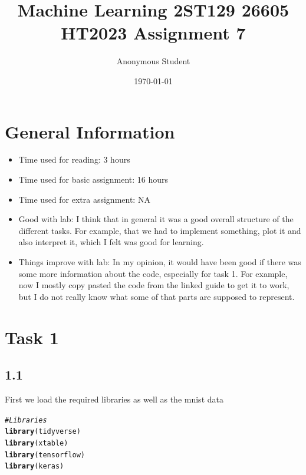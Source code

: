 \documentclass[10pt, a4paper, english]{article}\usepackage[]{graphicx}\usepackage[dvipsnames]{xcolor}
\title{Machine Learning 2ST129 26605 HT2023
 Assignment 7}
\author{Anonymous Student}
\date{\today}
\makeatletter
\newcommand{\hlcom}[1]{\textcolor[rgb]{0.678,0.584,0.686}{\textit{#1}}}%
\newcommand{\hlstd}[1]{\textcolor[rgb]{0.345,0.345,0.345}{#1}}%
\newcommand{\hlkwd}[1]{\textcolor[rgb]{0.737,0.353,0.396}{\textbf{#1}}}%
\newenvironment{kframe}{%
 \def\at@end@of@kframe{}%
 \ifinner\ifhmode%
  \def\at@end@of@kframe{\end{minipage}}%
  \begin{minipage}{\columnwidth}%
 \fi\fi%
 \def\FrameCommand##1{\hskip\@totalleftmargin \hskip-\fboxsep
 \colorbox{shadecolor}{##1}\hskip-\fboxsep
     \hskip-\linewidth \hskip-\@totalleftmargin \hskip\columnwidth}%
 \MakeFramed {\advance\hsize-\width
   \@totalleftmargin\z@ \linewidth\hsize
   \@setminipage}}%
 {\par\unskip\endMakeFramed%
 \at@end@of@kframe}
\newenvironment{knitrout}{}{} %
\makeatother
\begin{document}
\maketitle
\newpage
\tableofcontents
\newpage

\section{General Information}
\begin{itemize}
\item Time used for reading: 3 hours  
\item Time used for basic assignment: 16 hours
\item Time used for extra assignment: NA
\item Good with lab: I think that in general it was a good overall structure of the different tasks. For example, that we had to implement something, plot it and also interpret it, which I felt was good for learning.
\item Things improve with lab: In my opinion, it would have been good if there was some more information about the code, especially for task 1. For example, now I mostly copy pasted the code from the linked guide to get it to work, but I do not really know what some of that parts are supposed to represent. 
\end{itemize}

\newpage


\section{Task 1}

\subsection{1.1}
First we load the required libraries as well as the mnist data
\begin{knitrout}
\color{fgcolor}\begin{kframe}
\begin{alltt}
\hlcom{#Libraries}
 \hlkwd{library}\hlstd{(tidyverse)}
 \hlkwd{library}\hlstd{(xtable)}
 \hlkwd{library}\hlstd{(tensorflow)}
 \hlkwd{library}\hlstd{(keras)}
\end{alltt}
\end{kframe}
\end{knitrout}
\end{document}
